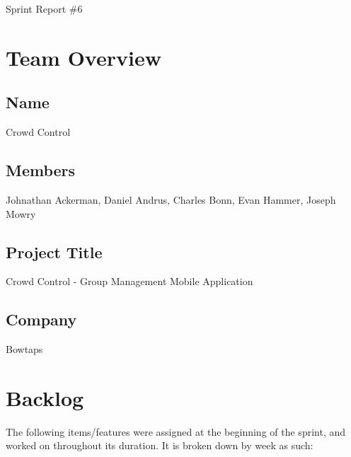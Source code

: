 \documentclass[11pt]{article}
\begin{document}
{\fontsize{16}{16}\selectfont Sprint Report \#6}

\section*{Team Overview}

\subsection*{Name}
Crowd Control
\subsection*{Members}
Johnathan Ackerman, Daniel Andrus, Charles Bonn, Evan Hammer, Joseph Mowry
\subsection*{Project Title}
Crowd Control - Group Management Mobile Application
\subsection*{Company}
Bowtaps


\section*{Backlog}
The following items/features were assigned at the beginning of the sprint, and worked on throughout its duration. It is broken down by week as such:
\end{document}
